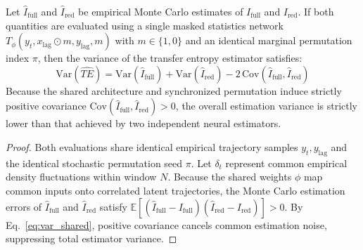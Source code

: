 \begin{proposition}
\label{prop:var_reduction}
Let $\widehat{I}_{\text{full}}$ and $\widehat{I}_{\text{red}}$ be empirical Monte Carlo estimates of $I_{\text{full}}$ and $I_{\text{red}}$. If both quantities are evaluated using a single masked statistics network $T_\phi(y_t, x_{\text{lag}} \odot m, y_{\text{lag}}, m)$ with $m \in \{1, 0\}$ and an identical marginal permutation index $\pi$, then the variance of the transfer entropy estimator satisfies:
\begin{equation}
\label{eq:var_shared}
\mathrm{Var}(\widehat{TE}) = \mathrm{Var}(\widehat{I}_{\text{full}}) + \mathrm{Var}(\widehat{I}_{\text{red}}) - 2\,\mathrm{Cov}(\widehat{I}_{\text{full}}, \widehat{I}_{\text{red}})
\end{equation}
Because the shared architecture and synchronized permutation induce strictly positive covariance $\mathrm{Cov}(\widehat{I}_{\text{full}}, \widehat{I}_{\text{red}}) > 0$, the overall estimation variance is strictly lower than that achieved by two independent neural estimators.
\end{proposition}
\begin{proof}
Both evaluations share identical empirical trajectory samples $y_t, y_{\text{lag}}$ and the identical stochastic permutation seed $\pi$. Let $\delta_t$ represent common empirical density fluctuations within window $N$. Because the shared weights $\phi$ map common inputs onto correlated latent trajectories, the Monte Carlo estimation errors of $\widehat{I}_{\text{full}}$ and $\widehat{I}_{\text{red}}$ satisfy $\mathbb{E}[(\widehat{I}_{\text{full}} - I_{\text{full}})(\widehat{I}_{\text{red}} - I_{\text{red}})] > 0$. By Eq.~\eqref{eq:var_shared}, positive covariance cancels common estimation noise, suppressing total estimator variance.
\end{proof}

